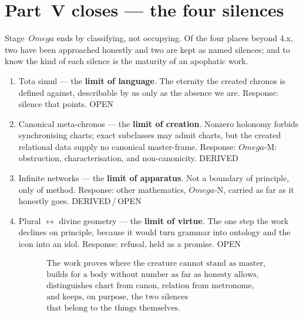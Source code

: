 \documentclass[11pt,a4paper]{article}
\def\Omega{Omega}%
\def\textit#1{#1}%
\def\emph#1{#1}%
\newcommand{\stDerived}{\textcolor{cDer}{\textsf{\small DERIVED}}}
\newcommand{\stOpen}{\textcolor{cOpn}{\textsf{\small OPEN}}}
\theoremstyle{definition}
\theoremstyle{plain}
\theoremstyle{remark}
\begin{document}
\section*{Part~V closes --- the four silences}

\noindent Stage~$\Omega$ ends by classifying, not occupying. Of the four places beyond 4.x, two
have been approached honestly and two are kept as named silences; and to know the \emph{kind} of
each silence is the maturity of an apophatic work.

\begin{enumerate}[label=\textup{\arabic*.},leftmargin=1.4cm]
\item \textit{Tota simul} --- the \textbf{limit of language}. The eternity the created chronos is
defined against, describable by us only as the absence we are. \emph{Response:} silence that
points. \hfill \stOpen
\item \emph{Canonical meta-chronos} --- the \textbf{limit of creation}. Nonzero
holonomy forbids synchronising charts; exact subclasses may admit charts, but the
created relational data supply no canonical master-frame. \emph{Response:}
\(\Omega\)-M: obstruction, characterisation, and non-canonicity.
\hfill \stDerived
\item \emph{Infinite networks} --- the \textbf{limit of apparatus}. Not a boundary of principle,
only of method. \emph{Response:} other mathematics, $\Omega$-N, carried as far as it honestly
goes. \hfill \stDerived\,/\,\stOpen
\item \emph{Plural $\leftrightarrow$ divine geometry} --- the \textbf{limit of virtue}. The one
step the work declines on principle, because it would turn grammar into ontology and the icon
into an idol. \emph{Response:} refusal, held as a promise. \hfill \stOpen
\end{enumerate}
\[
\boxed{
\begin{aligned}
&\text{The work proves where the creature cannot stand as master,}\\
&\text{builds for a body without number as far as honesty allows,}\\
&\text{distinguishes chart from canon, relation from metronome,}\\
&\text{and keeps, on purpose, the two silences}\\
&\text{that belong to the things themselves.}
\end{aligned}}
\]
\end{document}

